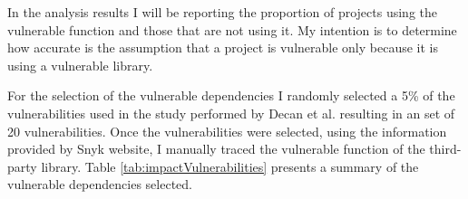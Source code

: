 In the analysis results I will be reporting the proportion of projects using the vulnerable function and those that are not using it. My intention is to determine how accurate is the assumption that a project is vulnerable only because it is using a vulnerable library.

For the selection of the vulnerable dependencies I randomly selected a 5\% of the vulnerabilities used in the study performed by Decan et al. \cite{decan2018impact} resulting in an set of 20 vulnerabilities. 
Once the vulnerabilities were selected, using the information provided by Snyk website, I manually traced the vulnerable function of the third-party library. Table \ref{tab:impactVulnerabilities} presents a summary of the vulnerable dependencies selected.

